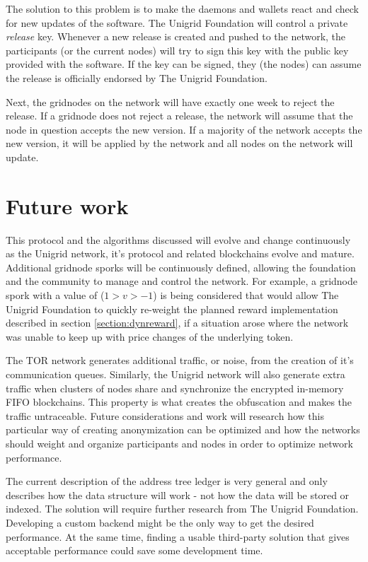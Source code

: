\documentclass[10pt,a4paper,final]{article}
\begin{document}
The solution to this problem is to make the daemons and wallets react and check for new updates of the software. The Unigrid Foundation will control a private \emph{release} key. Whenever a new release is created and pushed to the network, the participants (or the current nodes) will try to sign this key with the public key provided with the software. If the key can be signed, they (the nodes) can assume the release is officially endorsed by The Unigrid Foundation.

Next, the \glspl{gridnode} on the network will have exactly one week to reject the release. If a \gls{gridnode} does not reject a release, the network will assume that the node in question accepts the new version. If a majority of the network accepts the new version, it will be applied by the network and all nodes on the network will update.

\pagebreak
\section{Future work}
This protocol and the algorithms discussed will evolve and change continuously as the Unigrid network, it's protocol and related blockchains evolve and mature. Additional \gls{gridnode} sporks will be continuously defined, allowing the foundation and the community to manage and control the network. For example, a \gls{gridnode} spork with a value of ($1 > v > -1$) is being considered that would allow The Unigrid Foundation to quickly re-weight the planned reward implementation described in section \ref{section:dynreward}, if a situation arose where the network was unable to keep up with price changes of the underlying token.

The TOR network generates additional traffic, or noise, from the creation of it's communication queues. Similarly, the Unigrid network will also generate extra traffic when clusters of nodes share and synchronize the encrypted in-memory FIFO blockchains. This property is what creates the obfuscation and makes the traffic untraceable. Future considerations and work will research how this particular way of creating anonymization can be optimized and how the networks should weight and organize participants and nodes in order to optimize network performance.

The current description of the address tree ledger is very general and only describes how the data structure will work - not how the data will be stored or indexed. The solution will require further research from The Unigrid Foundation. Developing a custom backend might be the only way to get the desired performance. At the same time, finding a usable third-party solution that gives acceptable performance could save some development time.
\end{document}
